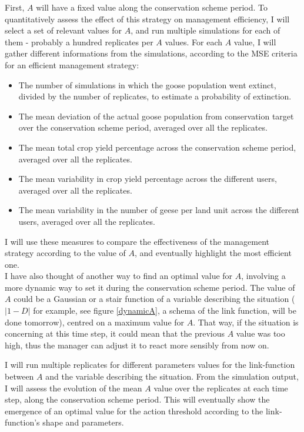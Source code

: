 \documentclass[12pt,a4paper]{article}
\begin{document}
First, $A$ will have a fixed value along the conservation scheme period.
To quantitatively assess the effect of this strategy on management efficiency, I will select a set of relevant values for $A$, and run multiple simulations for each of them - probably a hundred replicates per $A$ values.
For each $A$ value, I will gather different informations from the simulations, according to the MSE criteria for an efficient management strategy:
\begin{itemize}
	\item The number of simulations in which the goose population went extinct, divided by the number of replicates, to estimate a probability of extinction.
	\item The mean deviation of the actual goose population from conservation target over the conservation scheme period, averaged over all the replicates.
	\item The mean total crop yield percentage across the conservation scheme period, averaged over all the replicates.
	\item The mean variability in crop yield percentage across the different users, averaged over all the replicates.
	\item The mean variability in the number of geese per land unit across the different users, averaged over all the replicates.
\end{itemize}
I will use these measures to compare the effectiveness of the management strategy according to the value of $A$, and eventually highlight the most efficient one.\\

I have also thought of another way to find an optimal value for $A$, involving a more dynamic way to set it during the conservation scheme period.
The value of $A$ could be a Gaussian or a stair function of a variable describing the situation ($|1-D|$ for example, see figure \ref{dynamicA}, a schema of the link function, will be done tomorrow), centred on a maximum value for $A$.
That way, if the situation is concerning at this time step, it could mean that the previous $A$ value was too high, thus the manager can adjust it to react more sensibly from now on.

I will run multiple replicates for different parameters values for the link-function between $A$ and the variable describing the situation.
From the simulation output, I will assess the evolution of the mean $A$ value over the replicates at each time step, along the conservation scheme period.
This will eventually show the emergence of an optimal value for the action threshold according to the link-function's shape and parameters.\\
\end{document}
